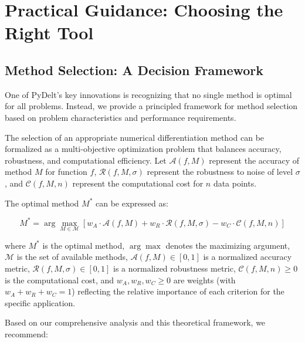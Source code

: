 \documentclass[10pt,journal,compsoc]{IEEEtran}
\begin{document}
\section{Practical Guidance: Choosing the Right Tool}

\subsection{Method Selection: A Decision Framework}

One of PyDelt's key innovations is recognizing that no single method is optimal for all problems. Instead, we provide a principled framework for method selection based on problem characteristics and performance requirements.

The selection of an appropriate numerical differentiation method can be formalized as a multi-objective optimization problem that balances accuracy, robustness, and computational efficiency. Let $\mathcal{A}(f, M)$ represent the accuracy of method $M$ for function $f$, $\mathcal{R}(f, M, \sigma)$ represent the robustness to noise of level $\sigma$, and $\mathcal{C}(f, M, n)$ represent the computational cost for $n$ data points.

The optimal method $M^*$ can be expressed as:

\begin{equation}
    M^* = \arg\max_{M \in \mathcal{M}} \left[ w_A \cdot \mathcal{A}(f, M) + w_R \cdot \mathcal{R}(f, M, \sigma) - w_C \cdot \mathcal{C}(f, M, n) \right]
\end{equation}

where $M^*$ is the optimal method, $\arg\max$ denotes the maximizing argument, $\mathcal{M}$ is the set of available methods, $\mathcal{A}(f, M) \in [0,1]$ is a normalized accuracy metric, $\mathcal{R}(f, M, \sigma) \in [0,1]$ is a normalized robustness metric, $\mathcal{C}(f, M, n) \geq 0$ is the computational cost, and $w_A, w_R, w_C \geq 0$ are weights (with $w_A + w_R + w_C = 1$) reflecting the relative importance of each criterion for the specific application.

Based on our comprehensive analysis and this theoretical framework, we recommend:
\end{document}
